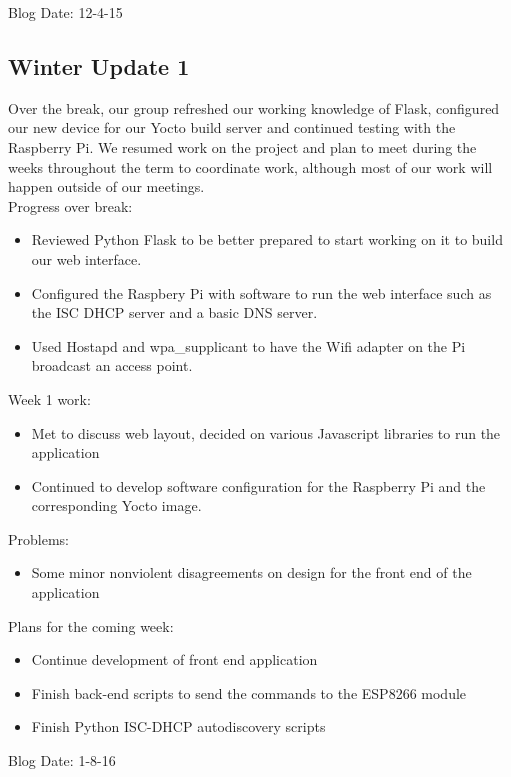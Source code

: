Blog Date: 12-4-15

\subsection{Winter Update 1}
Over the break, our group refreshed our working knowledge of Flask, configured our new device for our Yocto build server and continued testing with the Raspberry Pi. We resumed work on the project and plan to meet during the weeks throughout the term to coordinate work, although most of our work will happen outside of our meetings. \\
Progress over break:
\begin{itemize}
\item Reviewed Python Flask to be better prepared to start working on it to build our web interface.
\item Configured the Raspbery Pi with software to run the web interface such as the ISC DHCP server and a basic DNS server.
\item Used Hostapd and wpa\_supplicant to have the Wifi adapter on the Pi broadcast an access point.
\end{itemize}
Week 1 work:
\begin{itemize}
\item Met to discuss web layout, decided on various Javascript libraries to run the application
\item Continued to develop software configuration for the Raspberry Pi and the corresponding Yocto image.
\end{itemize}
Problems:
\begin{itemize}
\item Some minor nonviolent disagreements on design for the front end of the application​ 
\end{itemize}
Plans for the coming week: 
\begin{itemize}
\item Continue development of front end application
\item Finish back-end scripts to send the commands to the ESP8266 module
\item Finish Python ISC-DHCP autodiscovery scripts
\end{itemize}
Blog Date: 1-8-16

